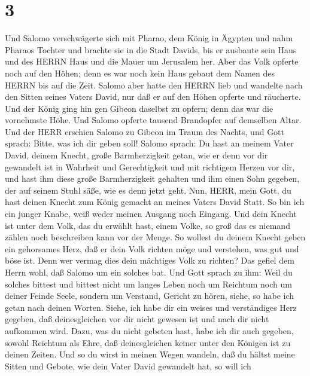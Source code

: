 \hypertarget{section-2}{%
\section{3}\label{section-2}}

 Und Salomo verschwägerte sich mit Pharao, dem König in
Ägypten und nahm Pharaos Tochter und brachte sie in die Stadt Davids,
bis er ausbaute sein Haus und des HERRN Haus und die Mauer um Jerusalem
her.  Aber das Volk opferte noch auf den Höhen; denn es war
noch kein Haus gebaut dem Namen des HERRN bis auf die Zeit. 
Salomo aber hatte den HERRN lieb und wandelte nach den Sitten seines
Vaters David, nur daß er auf den Höhen opferte und räucherte.
 Und der König ging hin gen Gibeon daselbst zu opfern; denn
das war die vornehmste Höhe. Und Salomo opferte tausend Brandopfer auf
demselben Altar.  Und der HERR erschien Salomo zu Gibeon im
Traum des Nachts, und Gott sprach: Bitte, was ich dir geben soll!
 Salomo sprach: Du hast an meinem Vater David, deinem
Knecht, große Barmherzigkeit getan, wie er denn vor dir gewandelt ist in
Wahrheit und Gerechtigkeit und mit richtigem Herzen vor dir, und hast
ihm diese große Barmherzigkeit gehalten und ihm einen Sohn gegeben, der
auf seinem Stuhl säße, wie es denn jetzt geht.  Nun, HERR,
mein Gott, du hast deinen Knecht zum König gemacht an meines Vaters
David Statt. So bin ich ein junger Knabe, weiß weder meinen Ausgang noch
Eingang.  Und dein Knecht ist unter dem Volk, das du erwählt
hast, einem Volke, so groß das es niemand zählen noch beschreiben kann
vor der Menge.  So wollest du deinem Knecht geben ein
gehorsames Herz, daß er dein Volk richten möge und verstehen, was gut
und böse ist. Denn wer vermag dies dein mächtiges Volk zu richten?
 Das gefiel dem Herrn wohl, daß Salomo um ein solches bat.
 Und Gott sprach zu ihm: Weil du solches bittest und
bittest nicht um langes Leben noch um Reichtum noch um deiner Feinde
Seele, sondern um Verstand, Gericht zu hören,  siehe, so
habe ich getan nach deinen Worten. Siehe, ich habe dir ein weises und
verständiges Herz gegeben, daß deinesgleichen vor dir nicht gewesen ist
und nach dir nicht aufkommen wird.  Dazu, was du nicht
gebeten hast, habe ich dir auch gegeben, sowohl Reichtum als Ehre, daß
deinesgleichen keiner unter den Königen ist zu deinen Zeiten.
 Und so du wirst in meinen Wegen wandeln, daß du hältst
meine Sitten und Gebote, wie dein Vater David gewandelt hat, so will ich
